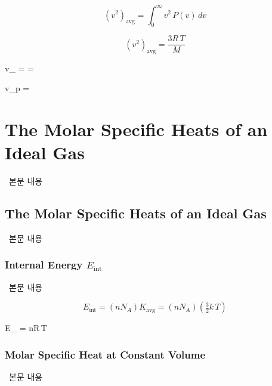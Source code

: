 \begin{equation} (v^2)_{\text{avg}} = \int_0^{\infty} v^2\, P(v)\, dv \end{equation}

\begin{equation} (v^2)_{\text{avg}} = \frac{3R\,T}{M} \end{equation}

\begin{eqbox} v_{} =  =  \quad {}
\label{eq:rms_speed} \end{eqbox}

\begin{eqbox} v_p =  ~~~~~ 
\label{eq:most_probable_speed} \end{eqbox}

\section{The Molar Specific Heats of an Ideal Gas}
%
\ 본문 내용

\subsection{The Molar Specific Heats of an Ideal Gas}
%
\ 본문 내용

\subsubsection{Internal Energy \( E_{\text{int}} \)}
%
\ 본문 내용

\begin{equation} E_{\text{int}} = (n N_A) K_{\text{avg}} = (n N_A) \left( \tfrac{3}{2} k\,T \right) \end{equation}

\begin{eqbox} E_{} =  nR\,T ~~~~~ 
\label{eq:internal_energy_of_monatomic_ideal_gas} \end{eqbox}

\subsubsection{Molar Specific Heat at Constant Volume}
%
\ 본문 내용


